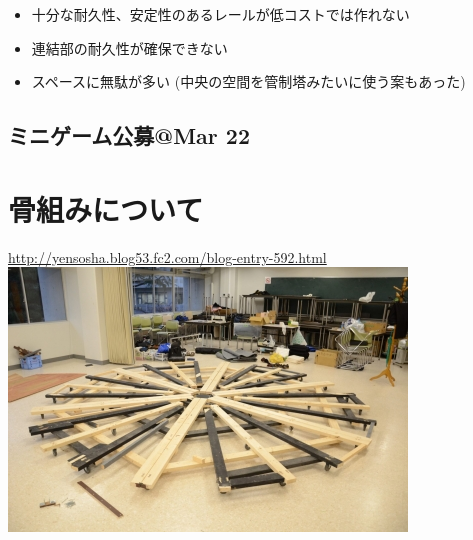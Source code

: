 \documentclass{jsarticle}
\begin{document}
\begin{itemize}
    \item 十分な耐久性、安定性のあるレールが低コストでは作れない
    \item 連結部の耐久性が確保できない
    \item スペースに無駄が多い (中央の空間を管制塔みたいに使う案もあった)
\end{itemize}

\subsection{ミニゲーム公募@Mar 22}

\section{骨組みについて}

\url{http://yensosha.blog53.fc2.com/blog-entry-592.html}
\includegraphics[]{images/base_bone_1.jpg}
\end{document}

